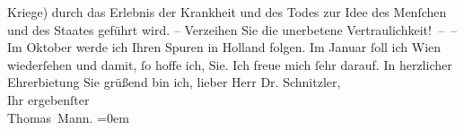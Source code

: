 \begin{ledgroupsized}[t]{13cm}
               Kriege) durch das Erlebnis der Krankheit und des Todes zur Idee des Menſchen und des
               Staates geführt wird. – Verzeihen Sie die unerbetene Vertraulichkeit! – –\pend
           \pstart
           Im Oktober werde ich Ihren Spuren in Holland folgen. Im Januar{ }ſoll ich Wien
               wiederſehen und damit, ſo hoffe ich, Sie. Ich freue mich ſehr darauf.\pend
           \pstart
           In herzlicher Ehrerbietung Sie grüßend bin ich, lieber Herr Dr.
               Schnitzler,{\\[\baselineskip]}Ihr ergebenſter{\\[\baselineskip]}\spacefill\mbox{Thomas Mann.}\pend
           \leftskip=0em{}
         
         \endnumbering{}\end{ledgroupsized}  \newcommand{\dateiname}{L02392}\newcommand{\titel}{Thomas Mann an Arthur Schnitzler, 4. 9. 1922}\newcommand{\editorInnen}{Martin Anton Müller und Gerd-Hermann Susen}
      